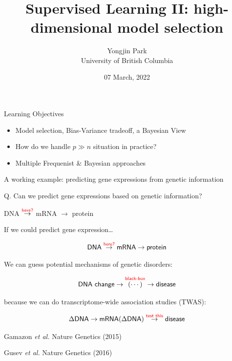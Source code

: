 \documentclass[
  ignorenonframetext,
  aspectratio=169]{beamer}
\title{Supervised Learning II: high-dimensional model selection}
\author{Yongjin Park\\
University of British Columbia}
\date{07 March, 2022}
\begin{document}
\frame{\titlepage}

\begin{frame}{Learning Objectives}
\protect\hypertarget{learning-objectives}{}
\large

\begin{itemize}
\item
  Model selection, Bias-Variance tradeoff, a Bayesian View
\item
  How do we handle \(p \gg n\) situation in practice?
\item
  Multiple Frequenist \& Bayesian approaches
\end{itemize}
\end{frame}

\begin{frame}{A working example: predicting gene expressions from
genetic information}
\protect\hypertarget{a-working-example-predicting-gene-expressions-from-genetic-information}{}
\Large

Q. Can we predict gene expressions based on genetic information?

\centering

DNA \(\overset{\textsf{\color{red} here?}}{\to}\) mRNA \(\to\) protein
\end{frame}

\begin{frame}{If we could predict gene expression\ldots{}}
\protect\hypertarget{if-we-could-predict-gene-expression}{}
\Large

\[\textsf{DNA} \overset{\textsf{\color{red} here?}}{\to} \textsf{mRNA} \to \textsf{protein}\]

\normalsize

We can guess potential mechanisms of genetic disorders:

\Large

\[\textsf{DNA change} \to \overset{\textsf{\color{red} black-box}}{(\cdots)} \to \textsf{disease}\]

\normalsize

because we can do transcriptome-wide association studies (TWAS):

\Large

\[\Delta\textsf{DNA} \to \textsf{mRNA}(\Delta \textsf{DNA}) \overset{\textsf{\color{red} test this}}{\to} \textsf{disease}\]

\tiny Gamazon \emph{et al.} Nature Genetics (2015)

\tiny Gusev \emph{et al.} Nature Genetics (2016)
\end{frame}
\end{document}
